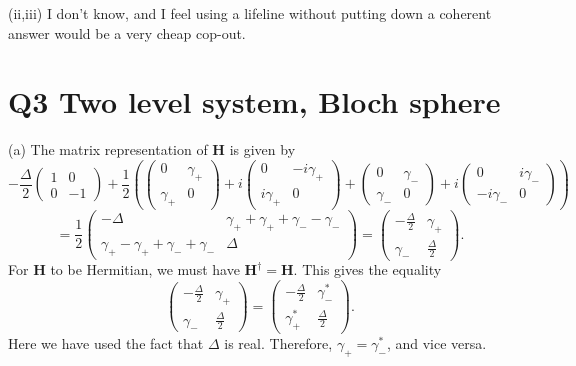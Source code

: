 \documentclass[11pt, letterpaper]{article}
\theoremstyle{plain}
\begin{document}
(ii,iii) I don't know, and I feel using a lifeline without putting down a coherent answer would be a very cheap cop-out.
\section{Q3 Two level system, Bloch sphere}
(a) The matrix representation of $\mathbf{H} $ is given by
\[
	-\frac{\Delta }{2} \begin{pmatrix}
	1 & 0 \\
	0 & -1
	\end{pmatrix}+\frac{1}{2} \left( \begin{pmatrix}
	0 & \gamma _+ \\
	\gamma _+ & 0
	\end{pmatrix}+i\begin{pmatrix}
	0 & -i \gamma _+ \\
	i\gamma _+ & 0
	\end{pmatrix}+\begin{pmatrix}
	0 & \gamma _- \\
	\gamma _- & 0
	\end{pmatrix}+i\begin{pmatrix}
	0 & i\gamma _- \\
	-i\gamma _- & 0
	\end{pmatrix} \right)
\]
\[
	=\frac{1}{2} \begin{pmatrix}
	-\Delta  & \gamma _++\gamma _++\gamma _- -\gamma _- \\
	\gamma _+-\gamma _++\gamma _- +\gamma _- & \Delta 
	\end{pmatrix}=\begin{pmatrix}
	-\frac{\Delta }{2}   & \gamma _+ \\
	\gamma _- & \frac{\Delta }{2} 
	\end{pmatrix}
.\]
For $\mathbf{H} $ to be Hermitian, we must have $\mathbf{H} ^\dagger = \mathbf{H} $. This gives the equality
\[
	\begin{pmatrix}
	-\frac{\Delta }{2}  & \gamma _+ \\
	\gamma _- & \frac{\Delta }{2} 
	\end{pmatrix}=\begin{pmatrix}
	-\frac{\Delta }{2}  & \gamma _-^* \\
	\gamma _+^* & \frac{\Delta }{2} 
	\end{pmatrix}
.\]
Here we have used the fact that $\Delta $ is real. Therefore, $\gamma _+=\gamma _-^*$, and vice versa.
\end{document}
